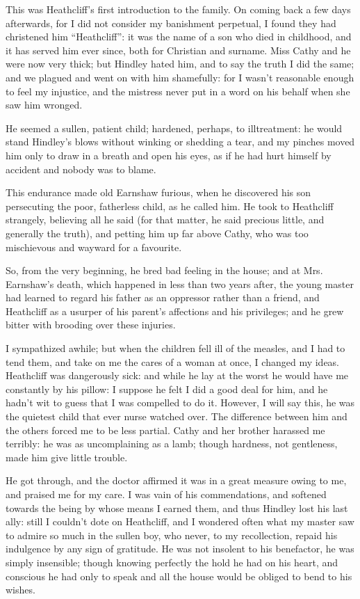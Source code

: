 \par This was Heathcliff's first introduction to the family. On coming back a few days afterwards, for I did not consider my banishment perpetual, I found they had christened him “Heathcliff”: it was the name of a son who died in childhood, and it has served him ever since, both for Christian and surname. Miss Cathy and he were now very thick; but Hindley hated him, and to say the truth I did the same; and we plagued and went on with him shamefully: for I wasn't reasonable enough to feel my injustice, and the mistress never put in a word on his behalf when she saw him wronged.
\par He seemed a sullen, patient child; hardened, perhaps, to illtreatment: he would stand Hindley's blows without winking or shedding a tear, and my pinches moved him only to draw in a breath and open his eyes, as if he had hurt himself by accident and nobody was to blame.
\par This endurance made old Earnshaw furious, when he discovered his son persecuting the poor, fatherless child, as he called him. He took to Heathcliff strangely, believing all he said (for that matter, he said precious little, and generally the truth), and petting him up far above Cathy, who was too mischievous and wayward for a favourite.
\par So, from the very beginning, he bred bad feeling in the house; and at Mrs. Earnshaw's death, which happened in less than two years after, the young master had learned to regard his father as an oppressor rather than a friend, and Heathcliff as a usurper of his parent's affections and his privileges; and he grew bitter with brooding over these injuries.
\par I sympathized awhile; but when the children fell ill of the measles, and I had to tend them, and take on me the cares of a woman at once, I changed my ideas. Heathcliff was dangerously sick: and while he lay at the worst he would have me constantly by his pillow: I suppose he felt I did a good deal for him, and he hadn't wit to guess that I was compelled to do it. However, I will say this, he was the quietest child that ever nurse watched over. The difference between him and the others forced me to be less partial. Cathy and her brother harassed me terribly: he was as uncomplaining as a lamb; though hardness, not gentleness, made him give little trouble.
\par He got through, and the doctor affirmed it was in a great measure owing to me, and praised me for my care. I was vain of his commendations, and softened towards the being by whose means I earned them, and thus Hindley lost his last ally: still I couldn't dote on Heathcliff, and I wondered often what my master saw to admire so much in the sullen boy, who never, to my recollection, repaid his indulgence by any sign of gratitude. He was not insolent to his benefactor, he was simply insensible; though knowing perfectly the hold he had on his heart, and conscious he had only to speak and all the house would be obliged to bend to his wishes.
